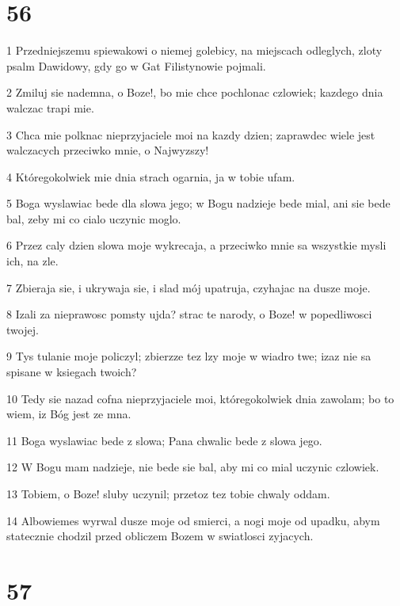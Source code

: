 \chapter{56}

\par 1 Przedniejszemu spiewakowi o niemej golebicy, na miejscach odleglych, zloty psalm Dawidowy, gdy go w Gat Filistynowie pojmali.
\par 2 Zmiluj sie nademna, o Boze!, bo mie chce pochlonac czlowiek; kazdego dnia walczac trapi mie.
\par 3 Chca mie polknac nieprzyjaciele moi na kazdy dzien; zaprawdec wiele jest walczacych przeciwko mnie, o Najwyzszy!
\par 4 Któregokolwiek mie dnia strach ogarnia, ja w tobie ufam.
\par 5 Boga wyslawiac bede dla slowa jego; w Bogu nadzieje bede mial, ani sie bede bal, zeby mi co cialo uczynic moglo.
\par 6 Przez caly dzien slowa moje wykrecaja, a przeciwko mnie sa wszystkie mysli ich, na zle.
\par 7 Zbieraja sie, i ukrywaja sie, i slad mój upatruja, czyhajac na dusze moje.
\par 8 Izali za nieprawosc pomsty ujda? strac te narody, o Boze! w popedliwosci twojej.
\par 9 Tys tulanie moje policzyl; zbierzze tez lzy moje w wiadro twe; izaz nie sa spisane w ksiegach twoich?
\par 10 Tedy sie nazad cofna nieprzyjaciele moi, któregokolwiek dnia zawolam; bo to wiem, iz Bóg jest ze mna.
\par 11 Boga wyslawiac bede z slowa; Pana chwalic bede z slowa jego.
\par 12 W Bogu mam nadzieje, nie bede sie bal, aby mi co mial uczynic czlowiek.
\par 13 Tobiem, o Boze! sluby uczynil; przetoz tez tobie chwaly oddam.
\par 14 Albowiemes wyrwal dusze moje od smierci, a nogi moje od upadku, abym statecznie chodzil przed obliczem Bozem w swiatlosci zyjacych.

\chapter{57}


